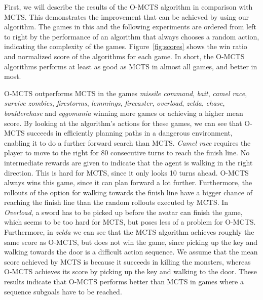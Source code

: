 First, we will describe the results of the O-MCTS algorithm in comparison with
MCTS\@.  This demonstrates the improvement that can be achieved by using our
algorithm.  The games in this and the following
experiments are ordered from left to right by the performance of an algorithm
that always chooses a random action, indicating the complexity of the games.
Figure~\ref{fig:scores} shows the win ratio and normalized score of the
algorithms for each game. In short, the O-MCTS algorithms performs at least as
good as MCTS in almost all games, and better in most.

O-MCTS outperforms MCTS in the games \textit{missile command}, \textit{bait},
\textit{camel race}, \textit{survive zombies}, \textit{firestorms},
\textit{lemmings}, \textit{firecaster}, \textit{overload}, \textit{zelda},
\textit{chase}, \textit{boulderchase} and \textit{eggomania} winning more games
or achieving a higher mean score. By looking at the algorithm's actions for
these games, we can see that O-MCTS succeeds in efficiently planning paths in a
dangerous environment, enabling it to do a further forward search than MCTS\@. 
\textit{Camel race} requires the player to
move to the right for 80 consecutive turns to reach the finish line. No
intermediate rewards are given to indicate that the agent is walking in the
right direction. This is hard for MCTS, since it only looks 10 turns ahead.
O-MCTS always wins this game, since it can plan forward a lot further.
Furthermore, the rollouts of the option for walking towards the finish line have
a bigger chance of reaching the finish line than the random rollouts executed by
MCTS\@.
In \textit{Overload}, a sword has to be picked up before the avatar can finish the
game, which seems to be too hard for MCTS, but poses less of a problem for
O-MCTS\@.  Furthermore, in \textit{zelda} we can see that the MCTS algorithm
achieves roughly the same score as O-MCTS, but does not win the game, since
picking up the key and walking towards the door is a difficult action sequence.
We assume that the mean score achieved by MCTS is because it succeeds in killing
the monsters, whereas O-MCTS achieves its score by picking up the key and
walking to the door.  These results indicate that O-MCTS performs better than
MCTS in games where a sequence subgoals have to be reached.

